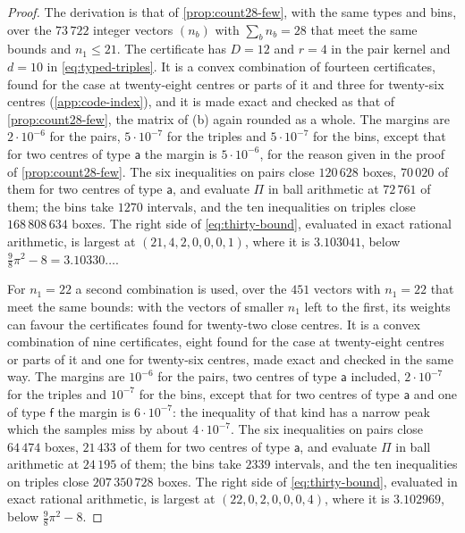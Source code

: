 \documentclass[11pt,reqno]{amsart}
\renewcommand{\_}{\origunderscore\allowbreak}
\numberwithin{equation}{section}
\theoremstyle{plain}
\theoremstyle{definition}
\theoremstyle{remark}
\begin{document}
\begin{proof}
The derivation is that of \cref{prop:count28-few}, with the same types and
bins, over the $73\,722$ integer vectors $(n_b)$ with $\sum_bn_b=28$ that
meet the same bounds and $n_1\le21$. The certificate
has $D=12$ and $r=4$ in the pair kernel and $d=10$ in
\eqref{eq:typed-triples}. It is a convex combination of fourteen certificates,
found for the case at twenty-eight centres or parts of it and three for
twenty-six centres (\cref{app:code-index}), and it is made exact and checked as that of
\cref{prop:count28-few}, the matrix of (b) again rounded as a whole.
The margins are $2\cdot10^{-6}$ for the pairs, $5\cdot10^{-7}$ for the
triples and $5\cdot10^{-7}$ for the bins, except that for two centres of
type $\mathsf a$ the margin is $5\cdot10^{-6}$, for the reason given in the
proof of \cref{prop:count28-few}. The six inequalities on pairs close $120\,628$ boxes,
$70\,020$ of them for two centres of type $\mathsf a$, and evaluate $\Pi$
in ball arithmetic at $72\,761$ of them; the bins take $1270$ intervals,
and the ten inequalities on triples close $168\,808\,634$ boxes. The right side
of \eqref{eq:thirty-bound}, evaluated in exact rational arithmetic, is
largest at $(21,4,2,0,0,0,1)$, where it is $3.103041$, below
$\frac98\pi^2-8=3.10330\ldots$.

For $n_1=22$ a second combination is used, over the $451$ vectors with
$n_1=22$ that meet the same bounds: with the vectors of smaller $n_1$ left to
the first, its weights can favour the certificates found for twenty-two close
centres. It is a convex combination of nine certificates, eight found for the
case at twenty-eight centres or parts of it and one for twenty-six centres,
made exact and checked in the same way. The margins are $10^{-6}$ for the
pairs, two centres of type $\mathsf a$ included, $2\cdot10^{-7}$ for the
triples and $10^{-7}$ for the bins, except that for two centres of type
$\mathsf a$ and one of type $\mathsf f$ the margin is $6\cdot10^{-7}$: the
inequality of that kind has a narrow peak which the samples miss by about
$4\cdot10^{-7}$. The six inequalities on pairs close $64\,474$ boxes,
$21\,433$ of them for two centres of type $\mathsf a$, and evaluate $\Pi$
in ball arithmetic at $24\,195$ of them; the bins take $2339$ intervals,
and the ten inequalities on triples close $207\,350\,728$ boxes. The right side
of \eqref{eq:thirty-bound}, evaluated in exact rational arithmetic, is
largest at $(22,0,2,0,0,0,4)$, where it is $3.102969$, below
$\frac98\pi^2-8$.


\end{proof}
\end{document}
